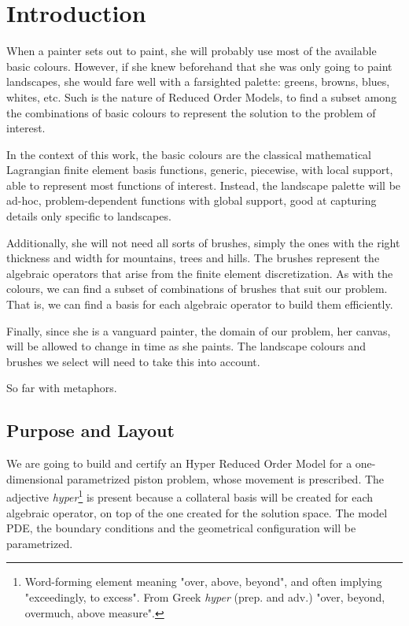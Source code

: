 \documentclass[thesis.tex]{subfiles}
\begin{document}
\section{Introduction}
When a painter sets out to paint, she will probably use most of the available basic colours.
However, if she knew beforehand that she was only going to paint landscapes, 
she would fare well with a farsighted palette: greens, browns, blues, whites, etc.
Such is the nature of Reduced Order Models, 
to find a subset among the combinations of basic colours 
to represent the solution to the problem of interest.

In the context of this work, 
the basic colours are the classical mathematical Lagrangian finite element basis functions, 
generic, piecewise, with local support, able to represent most functions of interest.
Instead, the landscape palette will be ad-hoc, 
problem-dependent functions with global support, 
good at capturing details only specific to landscapes.

Additionally, she will not need all sorts of brushes, 
simply the ones with the right thickness and width for mountains, trees and hills.
The brushes represent the algebraic operators that arise from the finite element discretization.
As with the colours, we can find a subset of combinations of brushes that suit our problem.
That is, we can find a basis for each algebraic operator to build them efficiently.

Finally, since she is a vanguard painter, the domain of our problem, her canvas, 
will be allowed to change in time as she paints.
The landscape colours and brushes we select will need to take this into account.

So far with metaphors.

\subsection{Purpose and Layout}
We are going to build and certify an
{Hyper Reduced Order Model} 
for a one-dimensional parametrized piston problem, 
whose movement is prescribed.
The adjective \mbox{\textit{hyper}}\footnote{
    Word-forming element meaning "over, above, beyond", 
    and often implying "exceedingly, to excess".
    From Greek \textit{hyper} (prep. and adv.) 
    "over, beyond, overmuch, above measure".
} is present because 
a collateral basis will be created for each algebraic operator,
on top of the one created for the solution space.
The model PDE, the boundary conditions and the geometrical configuration will be parametrized.
\end{document}
